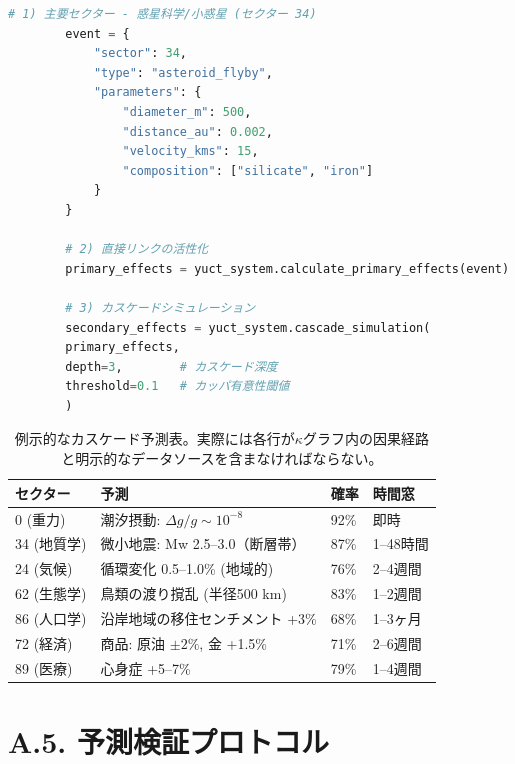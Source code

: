 \documentclass[13pt,a4paper]{ltjsarticle}
\begin{document}
	\begin{lstlisting}[language=Python]
		# 1) 主要セクター - 惑星科学/小惑星 (セクター 34)
		event = {
			"sector": 34,
			"type": "asteroid_flyby",
			"parameters": {
				"diameter_m": 500,
				"distance_au": 0.002,
				"velocity_kms": 15,
				"composition": ["silicate", "iron"]
			}
		}
		
		# 2) 直接リンクの活性化
		primary_effects = yuct_system.calculate_primary_effects(event)
		
		# 3) カスケードシミュレーション
		secondary_effects = yuct_system.cascade_simulation(
		primary_effects,
		depth=3,        # カスケード深度
		threshold=0.1   # カッパ有意性閾値
		)
	\end{lstlisting}
	
	\begin{table}[htbp]
		\centering
		\small
		\begin{tabular}{p{}p{}p{}p{}}
			\toprule
			\textbf{セクター} & \textbf{予測} & \textbf{確率} & \textbf{時間窓} \\
			\midrule
			0 (重力) & 潮汐摂動: $\Delta g/g \sim 10^{-8}$ & 92\% & 即時 \\
			34 (地質学) & 微小地震: Mw 2.5--3.0（断層帯） & 87\% & 1--48時間 \\
			24 (気候) & 循環変化 0.5--1.0\% (地域的) & 76\% & 2--4週間 \\
			62 (生態学) & 鳥類の渡り撹乱 (半径500 km) & 83\% & 1--2週間 \\
			86 (人口学) & 沿岸地域の移住センチメント +3\% & 68\% & 1--3ヶ月 \\
			72 (経済) & 商品: 原油 $\pm 2\%$, 金 +1.5\% & 71\% & 2--6週間 \\
			89 (医療) & 心身症 +5--7\% & 79\% & 1--4週間 \\
			\bottomrule
		\end{tabular}
		\caption{例示的なカスケード予測表。実際には各行が$\kappa$グラフ内の因果経路と明示的なデータソースを含まなければならない。}
	\end{table}
	
	\section*{A.5. 予測検証プロトコル}
	
\end{document}
